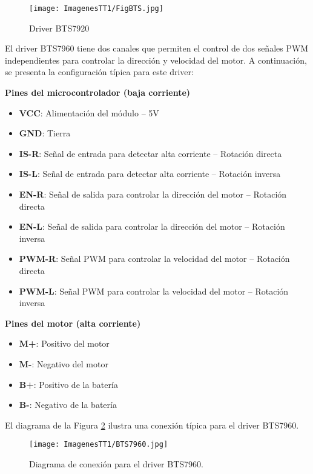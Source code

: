\documentclass[14pt,oneside]{extarticle} %
\begin{document}
\begin{figure}[h!]
    \centering
    \texttt{[image: ImagenesTT1/FigBTS.jpg]}
    \caption{Driver BTS7920}
    \label{fig:FigBTS}
\end{figure}


El driver BTS7960 tiene dos canales que permiten el control de dos señales PWM independientes para controlar la dirección y velocidad del motor. A continuación, se presenta la configuración típica para este driver:

\newpage

\textbf{Pines del microcontrolador (baja corriente)}

\begin{itemize}
    \item \textbf{VCC}: Alimentación del módulo – 5V
    \item \textbf{GND}: Tierra
    \item \textbf{IS-R}: Señal de entrada para detectar alta corriente – Rotación directa
    \item \textbf{IS-L}: Señal de entrada para detectar alta corriente – Rotación inversa
    \item \textbf{EN-R}: Señal de salida para controlar la dirección del motor – Rotación directa
    \item \textbf{EN-L}: Señal de salida para controlar la dirección del motor – Rotación inversa
    \item \textbf{PWM-R}: Señal PWM para controlar la velocidad del motor – Rotación directa
    \item \textbf{PWM-L}: Señal PWM para controlar la velocidad del motor – Rotación inversa
\end{itemize}

\textbf{Pines del motor (alta corriente)}

\begin{itemize}
    \item \textbf{M+}: Positivo del motor
    \item \textbf{M-}: Negativo del motor
    \item \textbf{B+}: Positivo de la batería
    \item \textbf{B-}: Negativo de la batería
\end{itemize}

El diagrama de la Figura \ref{fig:bts7960} ilustra una conexión típica para el driver BTS7960.

\begin{figure}[h!]
    \centering
    \texttt{[image: ImagenesTT1/BTS7960.jpg]}
    \caption{Diagrama de conexión para el driver BTS7960.}
    \label{fig:bts7960}
\end{figure}
\end{document}
